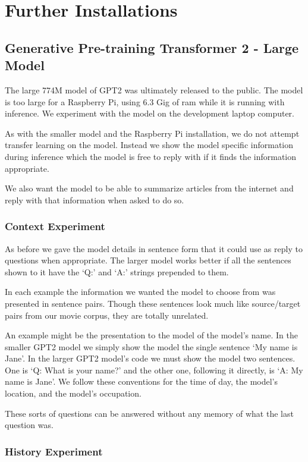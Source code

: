 \chapter{Further Installations}

\section{Generative Pre-training Transformer 2 - Large Model}

The large 774M model of GPT2 was ultimately released to the public. The model is too large for a Raspberry Pi, using 6.3 Gig of ram while it is running with inference. We experiment with the model on the development laptop computer.

As with the smaller model and the Raspberry Pi installation, we do not attempt transfer learning on the model. Instead we show the model specific information during inference which the model is free to reply with if it finds the information appropriate.

We also want the model to be able to summarize articles from the internet and reply with that information when asked to do so. 

\subsection{Context Experiment}

As before we gave the model details in sentence form that it could use as reply to questions when appropriate. The larger model works better if all the sentences shown to it have the `Q:' and `A:' strings prepended to them. 

In each example the information we wanted the model to choose from was presented in sentence pairs. Though these sentences look much like source/target pairs from our movie corpus, they are totally unrelated.

An example might be the presentation to the model of the model's name. In the smaller GPT2 model we simply show the model the single sentence `My name is Jane'. In the larger GPT2 model's code we must show the model two sentences. One is `Q: What is your name?' and the other one, following it directly, is `A: My name is Jane'. We follow these conventions for the time of day, the model's location, and the model's occupation.

These sorts of questions can be answered without any memory of what the last question was.

\subsection{History Experiment}

